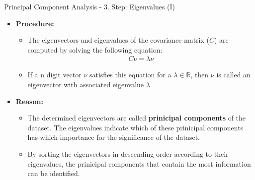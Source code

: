 \begin{frame}{Principal Component Analysis - 3. Step: Eigenvalues (I)}
	\begin{itemize}
		\item \textbf{Procedure:}
		\begin{itemize}
			\item The eigenvectors and eigenvalues of the covariance matrix 
			($C$) are computed by solving the following equation:
			\begin{align}
				C \nu = \lambda \nu
			\end{align}
			\item If a n digit vector $\nu$ satisfies this equation for a 
			$\lambda \in \mathbb{R}$, then $\nu$ is called an eigenvector with 
			associated eigenvalue $\lambda$
		\end{itemize}
		\item \textbf{Reason:}
		\begin{itemize}
			\item The determined eigenvectors are called \textbf{prinicipal 
			components} of the dataset. The eigenvalues indicate which of these 
			prinicipal components has which importance for the significance of 
			the dataset.
			\item By sorting the eigenvectors in descending order according to 
			their eigenvalues, the prinicipal components that contain the most 
			information can be identified.
		\end{itemize}
	\end{itemize}
\end{frame}

